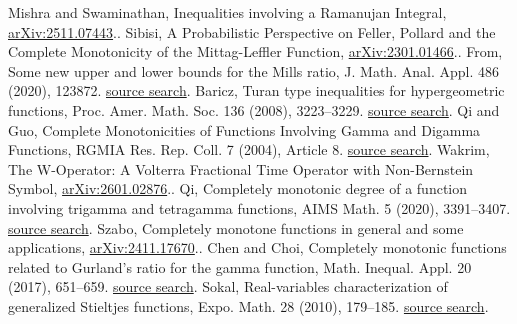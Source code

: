 \begin{thebibliography}{31}
 Mishra and Swaminathan, Inequalities involving a Ramanujan Integral, \href{https://arxiv.org/abs/2511.07443}{arXiv:2511.07443}..
 Sibisi, A Probabilistic Perspective on Feller, Pollard and the Complete Monotonicity of the Mittag-Leffler Function, \href{https://arxiv.org/abs/2301.01466}{arXiv:2301.01466}..
 From, Some new upper and lower bounds for the Mills ratio, J. Math. Anal. Appl. 486 (2020), 123872. \href{https://scholar.google.com/scholar?q=From%2C+Some+new+upper+and+lower+bounds+for+the+Mills+ratio%2C+J.+Math.+Anal.+Appl.+486+%282020%29%2C+123872.}{source search}.
 Baricz, Turan type inequalities for hypergeometric functions, Proc. Amer. Math. Soc. 136 (2008), 3223--3229. \href{https://scholar.google.com/scholar?q=Baricz%2C+Turan+type+inequalities+for+hypergeometric+functions%2C+Proc.+Amer.+Math.+Soc.+136+%282008%29%2C+3223--3229.}{source search}.
 Qi and Guo, Complete Monotonicities of Functions Involving Gamma and Digamma Functions, RGMIA Res. Rep. Coll. 7 (2004), Article 8. \href{https://scholar.google.com/scholar?q=Qi+and+Guo%2C+Complete+Monotonicities+of+Functions+Involving+Gamma+and+Digamma+Functions%2C+RGMIA+Res.+Rep.+Coll.+7+%282004%29%2C+Article+8.}{source search}.
 Wakrim, The W-Operator: A Volterra Fractional Time Operator with Non-Bernstein Symbol, \href{https://arxiv.org/abs/2601.02876}{arXiv:2601.02876}..
 Qi, Completely monotonic degree of a function involving trigamma and tetragamma functions, AIMS Math. 5 (2020), 3391--3407. \href{https://scholar.google.com/scholar?q=Qi%2C+Completely+monotonic+degree+of+a+function+involving+trigamma+and+tetragamma+functions%2C+AIMS+Math.+5+%282020%29%2C+3391--3407.}{source search}.
 Szabo, Completely monotone functions in general and some applications, \href{https://arxiv.org/abs/2411.17670}{arXiv:2411.17670}..
 Chen and Choi, Completely monotonic functions related to Gurland's ratio for the gamma function, Math. Inequal. Appl. 20 (2017), 651--659. \href{https://scholar.google.com/scholar?q=Chen+and+Choi%2C+Completely+monotonic+functions+related+to+Gurland%27s+ratio+for+the+gamma+function%2C+Math.+Inequal.+Appl.+20+%282017%29%2C+651--659.}{source search}.
 Sokal, Real-variables characterization of generalized Stieltjes functions, Expo. Math. 28 (2010), 179--185. \href{https://scholar.google.com/scholar?q=Sokal%2C+Real-variables+characterization+of+generalized+Stieltjes+functions%2C+Expo.+Math.+28+%282010%29%2C+179--185.}{source search}.

\end{thebibliography}
